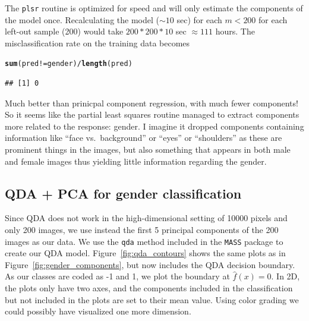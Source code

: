 \documentclass[a4paper]{article}\usepackage[]{graphicx}\usepackage[]{color}
\makeatletter
\newcommand{\hlopt}[1]{\textcolor[rgb]{0,0,0}{#1}}%
\newcommand{\hlstd}[1]{\textcolor[rgb]{0.345,0.345,0.345}{#1}}%
\newcommand{\hlkwd}[1]{\textcolor[rgb]{0.737,0.353,0.396}{\textbf{#1}}}%
\newenvironment{kframe}{%
 \def\at@end@of@kframe{}%
 \ifinner\ifhmode%
  \def\at@end@of@kframe{\end{minipage}}%
  \begin{minipage}{\columnwidth}%
 \fi\fi%
 \def\FrameCommand##1{\hskip\@totalleftmargin \hskip-\fboxsep
 \colorbox{shadecolor}{##1}\hskip-\fboxsep
     \hskip-\linewidth \hskip-\@totalleftmargin \hskip\columnwidth}%
 \MakeFramed {\advance\hsize-\width
   \@totalleftmargin\z@ \linewidth\hsize
   \@setminipage}}%
 {\par\unskip\endMakeFramed%
 \at@end@of@kframe}
\newenvironment{knitrout}{}{} %
\makeatother
\begin{document}
The \texttt{plsr} routine is optimized for speed and will only estimate the components of the model once. Recalculating the model ($\sim 10$ sec) for each $m < 200$ for each left-out sample (200) would take $200 * 200 * 10$ sec $\approx 111$ hours. The misclassification rate on the training data becomes
\begin{knitrout}
\color{fgcolor}\begin{kframe}
\begin{alltt}
\hlkwd{sum}\hlstd{(pred} \hlopt{!=} \hlstd{gender)} \hlopt{/} \hlkwd{length}\hlstd{(pred)}
\end{alltt}
\begin{verbatim}
## [1] 0
\end{verbatim}
\end{kframe}
\end{knitrout}
Much better than prinicpal component regression, with much fewer components! So it seems like the partial least squares routine managed to extract components more related to the response: gender. I imagine it dropped components containing information like ``face vs.\ background'' or ``eyes'' or ``shoulders'' as these are prominent things in the images, but also something that appears in both male and female images thus yielding little information regarding the gender.

\subsection{QDA + PCA for gender classification}



Since QDA does not work in the high-dimensional setting of 10000 pixels and only 200 images, we use instead the first 5 principal components of the 200 images as our data. We use the \texttt{qda} method included in the \texttt{MASS} package to create our QDA model. Figure~\ref{fig:qda_contours} shows the same plots as in Figure~\ref{fig:gender_components}, but now includes the QDA decision boundary. As our classes are coded as -1 and 1, we plot the boundary at $\hat{f}(x) = 0$. In 2D, the plots only have two axes, and the components included in the classification but not included in the plots are set to their mean value. Using color grading we could possibly have visualized one more dimension.
\end{document}
